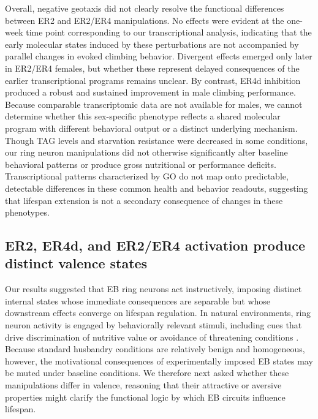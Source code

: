 Overall, negative geotaxis did not clearly resolve the functional differences between ER2 and ER2/ER4 manipulations. 
No effects were evident at the one-week time point corresponding to our transcriptional analysis, indicating that the early molecular states induced by these perturbations are not accompanied by parallel changes in evoked climbing behavior. 
Divergent effects emerged only later in ER2/ER4 females, but whether these represent delayed consequences of the earlier transcriptional programs remains unclear. 
By contrast, ER4d inhibition produced a robust and sustained improvement in male climbing performance. 
Because comparable transcriptomic data are not available for males, we cannot determine whether this sex-specific phenotype reflects a shared molecular program with different behavioral output or a distinct underlying mechanism. 
Though TAG levels and starvation resistance were decreased in some conditions, our ring neuron manipulations did not otherwise significantly alter baseline behavioral patterns or produce gross nutritional or performance deficits. 
Transcriptional patterns characterized by GO do not map onto predictable, detectable differences in these common health and behavior readouts, suggesting that lifespan extension is not a secondary consequence of changes in these phenotypes.


\subsection*{ER2, ER4d, and ER2/ER4 activation produce distinct valence states}

Our results suggested that EB ring neurons act instructively, imposing distinct internal states whose immediate consequences are separable but whose downstream effects converge on lifespan regulation. 
In natural environments, ring neuron activity is engaged by behaviorally relevant stimuli, including cues that drive discrimination of nutritive value \citep{park2016} or avoidance of threatening conditions \citep{buhl2021}. 
Because standard husbandry conditions are relatively benign and homogeneous, however, the motivational consequences of experimentally imposed EB states may be muted under baseline conditions. 
We therefore next asked whether these manipulations differ in valence, reasoning that their attractive or aversive properties might clarify the functional logic by which EB circuits influence lifespan.

